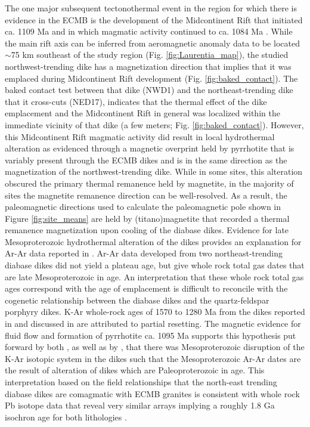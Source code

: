 \documentclass[draft]{agujournal2019}
\begin{document}
The one major subsequent tectonothermal event in the region for which there is evidence in the ECMB is the development of the Midcontinent Rift that initiated ca. 1109 Ma and in which magmatic activity continued to ca. 1084 Ma \cite{Fairchild2017a, Swanson-Hysell2019a}. While the main rift axis can be inferred from aeromagnetic anomaly data to be located $\sim$75 km southeast of the study region (Fig. \ref{fig:Laurentia_map}), the studied northwest-trending dike has a magnetization direction that implies that it was emplaced during Midcontinent Rift development (Fig. \ref{fig:baked_contact}). The baked contact test between that dike (NWD1) and the northeast-trending dike that it cross-cuts (NED17), indicates that the thermal effect of the dike emplacement and the Midcontinent Rift in general was localized within the immediate vicinity of that dike (a few meters; Fig. \ref{fig:baked_contact}). However, this Midcontinent Rift magmatic activity did result in local hydrothermal alteration as evidenced through a magnetic overprint held by pyrrhotite that is variably present through the ECMB dikes and is in the same direction as the magnetization of the northwest-trending dike. While in some sites, this alteration obscured the primary thermal remanence held by magnetite, in the majority of sites the magnetite remanence direction can be well-resolved. As a result, the paleomagnetic directions used to calculate the paleomagnetic pole shown in Figure \ref{fig:site_means} are held by (titano)magnetite that recorded a thermal remanence magnetization upon cooling of the diabase dikes. Evidence for late Mesoproterozoic hydrothermal alteration of the dikes provides an explanation for Ar-Ar data reported in \cite{Boerboom2000a}. Ar-Ar data developed from two northeast-trending diabase dikes did not yield a plateau age, but give whole rock total gas dates that are late Mesoproterozoic in age. An interpretation that these whole rock total gas ages correspond with the age of emplacement is difficult to reconcile with the cogenetic relationship between the diabase dikes and the quartz-feldspar porphyry dikes. K-Ar whole-rock ages of 1570 to 1280 Ma from the dikes reported in \cite{Hanson1968a} and discussed in \cite{Horan1987a} are attributed to partial resetting. The magnetic evidence for fluid flow and formation of pyrrhotite ca. 1095 Ma supports this hypothesis put forward by both \cite{Horan1987a}, as well as by \cite{Boerboom2000a}, that there was Mesoproterozoic disruption of the K-Ar isotopic system in the dikes such that the Mesoproterozoic Ar-Ar dates are the result of alteration of dikes which are Paleoproterozoic in age. This interpretation based on the field relationships that the north-east trending diabase dikes are comagmatic with ECMB granites is consistent with whole rock Pb isotope data that reveal very similar arrays implying a roughly 1.8 Ga isochron age for both lithologies \cite{Horan1987a}. 
\end{document}
